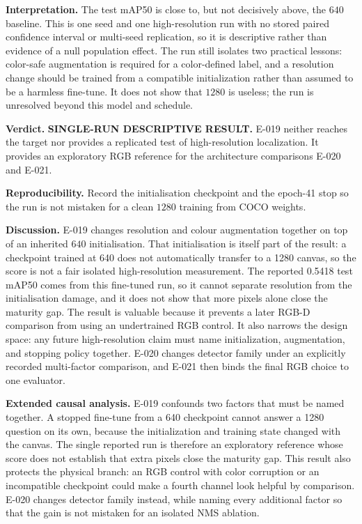 \documentclass[preprint,12pt]{elsarticle}
\begin{document}
\textbf{Interpretation.} The test mAP50 is close to, but not decisively above,
the \(640\) baseline. This is one seed and one high-resolution run with no
stored paired confidence interval or multi-seed replication, so it is
descriptive rather than evidence of a null population effect. The run still
isolates two practical lessons:
color-safe augmentation is required for a color-defined label, and a
resolution change should be trained from a compatible initialization rather
than assumed to be a harmless fine-tune. It does not show that \(1280\) is
useless; the run is unresolved beyond this model and schedule.

\textbf{Verdict.} \textbf{SINGLE-RUN DESCRIPTIVE RESULT.} E-019 neither
reaches the target nor provides a replicated test of high-resolution
localization. It provides an exploratory RGB reference for the architecture
comparisons E-020 and E-021.

\textbf{Reproducibility.} Record the initialisation checkpoint and the
epoch-41 stop so the run is not mistaken for a clean \(1280\) training from
COCO weights.

\textbf{Discussion.} E-019 changes resolution and colour augmentation together
on top of an inherited \(640\) initialisation. That initialisation is itself
part of the result: a checkpoint trained at 640 does not automatically
transfer to a 1280 canvas, so the score is not a fair isolated
high-resolution measurement. The reported 0.5418 test mAP50 comes from this
fine-tuned run, so it cannot separate resolution from the initialisation
damage, and it does not show that more pixels alone close the maturity
gap. The result is valuable because it prevents a later RGB-D comparison from
using an undertrained RGB control. It also narrows the design space: any
future high-resolution claim must name initialization, augmentation, and
stopping policy together. E-020 changes detector family under an explicitly
recorded multi-factor comparison, and E-021 then binds the final RGB choice
to one evaluator.

\textbf{Extended causal analysis.} E-019 confounds two factors that must be
named together. A stopped fine-tune from a 640 checkpoint cannot answer a
1280 question on its own, because the initialization and training state
changed with the canvas. The single reported run is therefore an exploratory
reference whose score does not establish that extra pixels close the maturity
gap. This result also protects the physical
branch: an RGB control with color corruption or an incompatible checkpoint
could make a fourth channel look helpful by comparison. E-020 changes detector
family instead, while naming every additional factor so that the gain is not
mistaken for an isolated NMS ablation.
\end{document}
